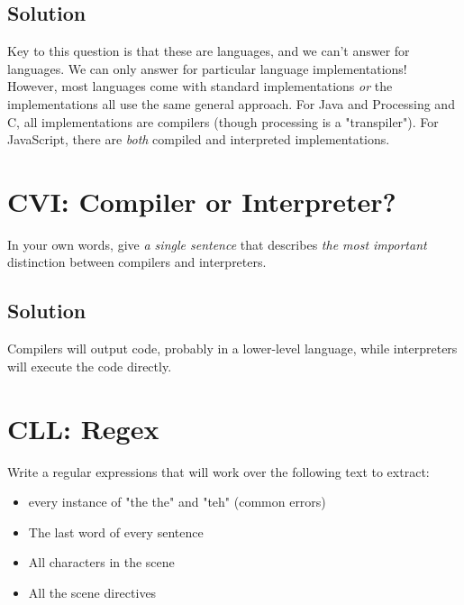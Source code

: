 \documentclass[twoside=false, DIV=14]{scrartcl}
\begin{document}
\subsection*{Solution}
Key to this question is that these are languages, and we can't answer for languages. We can only answer for particular language implementations! However, most languages come with standard implementations \emph{or} the implementations all use the same general approach. For Java and Processing and C, all implementations are compilers (though processing is a "transpiler"). For JavaScript, there are \emph{both} compiled and interpreted implementations.

\section*{CVI: Compiler or Interpreter?}
In your own words, give \emph{a single sentence} that describes \emph{the most important} distinction between compilers and interpreters.

\subsection*{Solution}
Compilers will output code, probably in a lower-level language, while interpreters will execute the code directly.

\section*{CLL: Regex}
  Write a regular expressions that will work over the following text to extract:
  \begin{itemize}
    \item every instance of "the the" and "teh" (common errors)
    \item The last word of every sentence
    \item All characters in the scene
    \item All the scene directives
  \end{itemize}
\end{document}
